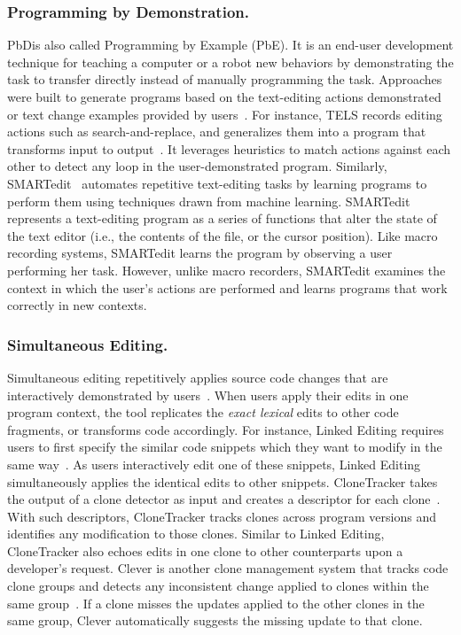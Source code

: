 \documentclass[runningheads,a4paper]{llncs}
\begin{document}
\subsubsection{Programming by Demonstration.} 
PbDis also called Programming by Example (PbE). It is an end-user development technique for teaching a computer or a robot new behaviors by demonstrating the task to transfer directly instead of manually programming the task.
Approaches were built to generate programs based on the text-editing actions demonstrated or text change examples provided by users~\cite{Nix1984,WiM1993,LaH1995,LWD2001}. For instance, 
TELS records editing actions such as search-and-replace, and generalizes them into a program that transforms input to output~\cite{WiM1993}. It leverages heuristics to match actions against each other to detect any loop in the user-demonstrated program. 
Similarly, SMARTedit~\cite{LWD2001} automates repetitive text-editing tasks by learning programs to perform them using techniques drawn from machine learning. SMARTedit represents a text-editing program as a series of functions that alter the state of the text editor (i.e., the contents of the file, or the cursor position). Like macro recording systems, SMARTedit learns the program by observing a user performing her task. However, unlike macro recorders, SMARTedit examines the context in which the user's actions are performed and learns programs that work correctly in new contexts. 

\subsubsection{Simultaneous Editing.}
Simultaneous editing repetitively applies source code changes that are interactively demonstrated by users~\cite{MiM2001}. When users apply their edits in one program context, the tool replicates the \emph{exact lexical} edits to other code fragments, or transforms code accordingly. For instance, Linked Editing requires users to first specify the similar code snippets which they want to modify in the same way~\cite{TBG2004}. As users interactively edit one of these snippets, Linked Editing simultaneously applies the identical edits to other snippets. 
CloneTracker takes the output of a clone detector as input and creates a descriptor for each clone~\cite{DuR2007}. With such descriptors, CloneTracker tracks clones across program versions and identifies any modification to those clones. 
Similar to Linked Editing, CloneTracker also echoes edits in one clone to other counterparts upon a developer's request. 
Clever is another clone management system that tracks code clone groups and detects any inconsistent change applied to clones within the same group~\cite{NNP2009}. If a clone misses the updates applied to the other clones in the same group, Clever automatically suggests the missing update to that clone.
\end{document}
